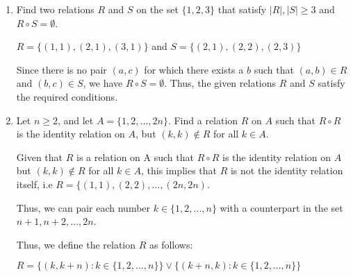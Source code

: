 \documentclass{article}
\newcommand{\bN}{\mathbb{N}}
\begin{document}
{\begin{enumerate}[labelindent=0pt,leftmargin=0pt]
    Proof: We will prove by induction that for all $1 < n \in \bN$ is equal to the product of two prime numbers. 

    Base case: $n=2$, Since 2 is a prime number it can be represented as a product of the prime number 1 and itself. 

    Assume that for all natural numbers $m$ with $2 \leq m \leq n$, $m$ can be represented as a product of prime numbers.
 
    We want to show that $(n+1)$ can be represented as a product of prime numbers. We will consider the following two cases. 

    Case 1:  $(n+1)$ is prime

    If $(n+1)$ is prime, then it is itself a product of prime numbers this being the prime number one and itself.

    Case 2: $(n+1)$ is composite
    
    If $(n+1)$ is composite, then there exists $a,b \in\bN$ with $1 \leq a < n+1$ and $1 \leq b < n+1$ such that $(n+1) = a \cdot b$. 
    By inductive hypothesis, we know that $a$ and $b$ can be represented as a product of prime numbers. 
    Therefore, $(n+1)$ can also be represented as a product of prime numbers, as it is the product of $a$ and $b$.

    In both cases, $(n+1)$ can be represented as a product of prime numbers. By strong induction, every natural number greater than $1$ is equal to a product of prime numbers.


    \item Find two relations $R$ and $S$ on the set $\{1,2,3\}$ that satisfy $|R|,|S|\geq 3$ and $R\circ S=\emptyset$.

    $R = \{(1,1),(2,1),(3,1 )\} $ and $S=\{(2,1),(2,2),(2,3)\}$

    Since there is no pair $(a, c)$ for which there exists a $b$ such that $(a, b) \in R$ and $(b, c) \in S$, we have $R \circ S = \emptyset$. Thus, the given relations $R$ and $S$ satisfy the required conditions.

    \item Let $n\geq 2$, and let $A=\{1,2,...,2n\}$. Find a relation $R$ on $A$ such that $R\circ R$ is the identity relation on $A$, but $(k,k)\not\in R$ for all $k\in A$.

    Given that $R$ is a relation on A such that $R\circ R$ is the identity relation on $A$ but $(k,k)\not\in R$ for all $k\in A$, this implies that $R$ is not the identity relation itself, i.e $R=\{(1,1),(2,2),...,(2n,2n)$.

    Thus, we can pair each number $k\in \{1,2,...,n\}$ with a counterpart in the set ${n+1, n+2,...,2n}$.
    
    Thus, we define the relation $R$ as follows:
   
    $R=\{(k,k+n):k\in\{1,2,...,n\}\}\lor\{(k+n,k):k\in\{1,2,...,n\}\}$

\end{enumerate}

}
\end{document}
